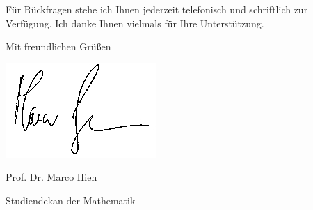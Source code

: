\documentclass{serienbrief}
\newif\ifmore \moretrue
\begin{document}
Für Rückfragen stehe ich Ihnen jederzeit telefonisch und schriftlich
zur Verfügung. Ich danke Ihnen vielmals für Ihre Unterstützung.

Mit freundlichen Gr\"u\ss en

\hspace{1cm}\includegraphics[scale=0.4]{unterschrift_marco_hien}\vspace{-0.4cm}

Prof. Dr. Marco Hien

\vspace{-0.2cm}

{\small Studiendekan der Mathematik}

\newpage

 \fi
 \ifmore\repeat
 
 \closein\quelle
\end{document}
